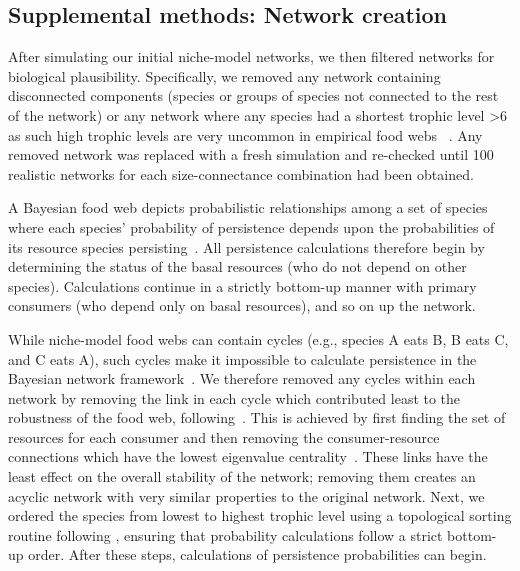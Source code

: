 \documentclass[12pt]{article}
\begin{document}
\begin{spacing}{2.0}

    

\section{Supplemental methods: Network creation}

    After simulating our initial niche-model networks, we then filtered networks for biological plausibility.
    Specifically, we removed any network containing disconnected components
    (species or groups of species not connected to the rest of the network) 
    or any network where any species had a shortest trophic level \textgreater6 as such high trophic levels are very uncommon in empirical food webs ~\citep{Riede2011}.
    Any removed network was replaced with a fresh simulation and re-checked until 100 realistic networks for each size-connectance combination had been obtained.
    

    A Bayesian food web depicts probabilistic relationships among a set of species where each species' probability of persistence depends upon the probabilities of its resource species persisting~\citep{Jensen_Nielsen,Eklof2013}. 
    All persistence calculations therefore begin  by determining the status of the basal resources (who do not depend on other species).
    Calculations continue in a strictly bottom-up manner with primary consumers (who depend only on basal resources), and so on up the network.

        
    While niche-model food webs can contain cycles (e.g., species A eats B, B eats C, and C eats A), such cycles make it impossible to calculate persistence in the Bayesian network framework~\citep{Tarjan1972}. 
    We therefore removed any cycles within each network by removing the link in each cycle which contributed least to the robustness of the food web, following~\citet{Allesina2009}.
    This is achieved by first finding the set of resources for each consumer and then removing the consumer-resource connections which have the lowest eigenvalue centrality~\citep{Allesina2009}.
    These links have the least effect on the overall stability of the network; removing them creates an acyclic network with very similar properties to the original network.
    Next, we ordered the species from lowest to highest trophic level using a topological sorting routine following \citep{Tarjan1972, Allesinaetal2005}, ensuring that probability calculations follow a strict bottom-up order. 
    After these steps, calculations of persistence probabilities can begin.
        

\end{spacing}
\end{document}
